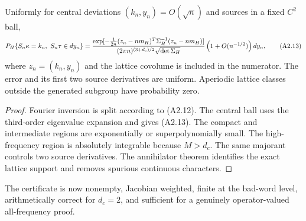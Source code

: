 \begin{theorem}
\label{thm:r29-a2-llt}
Uniformly for central deviations $(k_n,y_n)=O(\sqrt n)$ and sources in a fixed
$C^2$ ball,
\[
 P_H\{S_n\kappa=k_n,\ S_n\tau\in dy_n\}
 ={\exp[-\frac1{2n}(z_n-nm_H)^T\Sigma_H^{-1}(z_n-nm_H)]
   \over(2\pi n)^{(3+d_c)/2}\sqrt{\det\Sigma_H}}
 \left(1+O(n^{-1/2})\right)dy_n,                          \tag{A2.13}
\]
where $z_n=(k_n,y_n)$ and the lattice covolume is included in the numerator.
The error and its first two source derivatives are uniform.  Aperiodic lattice
classes outside the generated subgroup have probability zero.
\end{theorem}

\begin{proof}
Fourier inversion is split according to (A2.12).  The central ball uses the
third-order eigenvalue expansion and gives (A2.13).  The compact and
intermediate regions are exponentially or superpolynomially small.  The
high-frequency region is absolutely integrable because $M>d_c$.  The same
majorant controls two source derivatives.  The annihilator theorem identifies
the exact lattice support and removes spurious continuous characters.
\end{proof}

The certificate is now nonempty, Jacobian weighted, finite at the bad-word
level, arithmetically correct for $d_c=2$, and sufficient for a genuinely
operator-valued all-frequency proof.
